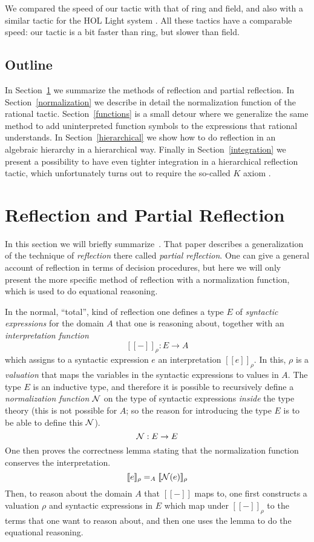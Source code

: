 \documentclass[runningheads]{llncs}
\newcommand{\inte}[1]{[\![#1]\!]}
\newcommand{\intfun}[1]{\inte{#1}_\rho}
\newcommand{\N}{{\cal N}}
\newcommand{\tacticname}[1]{\textsf{#1}}
\newcommand{\rational}{\tacticname{rational}}
\begin{document}
We compared the speed of our tactic with that of \tacticname{ring} and
\tacticname{field}, and also with a similar tactic for the HOL Light system
\cite{har:00}.
All these tactics have a comparable speed: our tactic is a bit faster
than \tacticname{ring}, but slower than \tacticname{field}.

\subsection{Outline}

In Section~\ref{reflection} we summarize the methods of reflection
and partial reflection.
In Section~\ref{normalization} we describe in detail the normalization
function of the {\rational} tactic.
Section~\ref{functions} is a small detour where we generalize the same
method to add uninterpreted function
symbols to the expressions that {\rational} understands.
In Section~\ref{hierarchical} we show how to do reflection in an
algebraic hierarchy in a hierarchical way.
Finally in Section~\ref{integration} we present a possibility
to have even tighter integration in a hierarchical reflection tactic,
which unfortunately turns out to require the so-called $K$ axiom \cite{str:93}.


\section{Reflection and Partial Reflection}\label{reflection} %

In this section we will briefly summarize~\cite{geu:wie:zwa:00}.
That paper describes a generalization of the technique of
\emph{reflection} there called \emph{partial reflection}.
One can give a general account of reflection in terms of
decision procedures, but here we will only present the more
specific method of reflection with
a normalization function, which is used to do equational reasoning.

In the normal, ``total'', kind of reflection
one defines a type $E$ of \emph{syntactic
expressions} for the domain $A$ that one is reasoning about,
together with an \emph{interpretation function}
$$\intfun{-} : E \to A$$
which assigns
to a syntactic expression $e$ an interpretation $\intfun{e}$.
In this, $\rho$ is a \emph{valuation} that maps the variables
in the syntactic expressions to values in $A$.
The type $E$ is an inductive type,
and therefore it is possible to recursively define a \emph{normalization function}
$\N$ on the type of syntactic expressions \emph{inside} the type
theory (this is not possible for $A$;
so the reason for introducing the type $E$ is to be able to define this $\N$).
$$\N : E \to E$$
One then proves the correctness lemma stating that the
normalization function conserves the interpretation.
$$\intfun{e} =_A \intfun{\N(e)}$$
Then, to
reason about the domain $A$ that $\inte{-}$ maps to,
one first constructs a valuation $\rho$ and
syntactic expressions in $E$ which map under $\intfun{-}$ to the
terms that one want to reason about, and
then one uses the lemma to do the equational reasoning.
\end{document}
